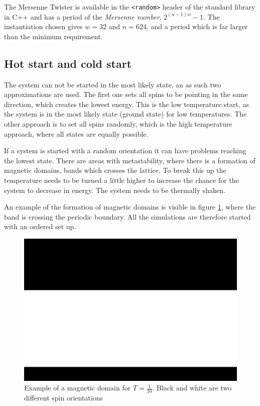 \documentclass[11pt,a4paper,final]{article}
\numberwithin{equation}{section}
\newcommand{\figurewidth}{.85\textwidth}
\begin{document}
The Mersenne Twister is available in the \texttt{<random>} header 
of the standard
library in C++ and has a period of the \emph{Mersenne number},
$2^{(n-1)w}-1$.
The instantiation chosen gives $w=32$ and $n=624$, and a period which is 
far larger than the minimum requirement.

\subsection{Hot start and cold start}
The system can not be started in the most likely state, an as such two 
approximations are used. The first one sets all spins to be pointing in 
the same direction, which creates the lowest energy. This is the 
low temperature start, as the system is in the most likely state 
(ground state) for low temperatures. The other approach is to set 
all spins randomly, which is the high temperature approach, where 
all states are equally possible.

If a system is started with a random orientation it can have problems 
reaching the lowest state. There are areas with metastability, where 
there is a formation of magnetic domains, bands which crosses the lattice.
To break this up the temperature needs to be turned a little higher to 
increase the chance for the system to decrease in energy. The system 
needs to be thermally shaken.

An example of the formation of magnetic domains is visible in 
figure \ref{fig:mag_domain}, where the band is crossing the periodic 
boundary. All the simulations are therefore started with an ordered
set up.

\begin{figure}
\centering
\includegraphics[width=\figurewidth]{pics/mag_domain.png}
\caption{Example of a magnetic domain for $T = \frac{1}{10}$. Black 
and white are two different spin orientations}
\label{fig:mag_domain}
\end{figure}
\end{document}
